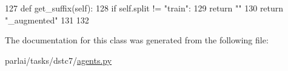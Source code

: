 \begin{DoxyCode}
127     \textcolor{keyword}{def }get\_suffix(self):
128         \textcolor{keywordflow}{if} self.split != \textcolor{stringliteral}{"train"}:
129             \textcolor{keywordflow}{return} \textcolor{stringliteral}{""}
130         \textcolor{keywordflow}{return} \textcolor{stringliteral}{"\_augmented"}
131 
132 
\end{DoxyCode}


The documentation for this class was generated from the following file\+:\begin{DoxyCompactItemize}
\item 
parlai/tasks/dstc7/\hyperlink{parlai_2tasks_2dstc7_2agents_8py}{agents.\+py}\end{DoxyCompactItemize}
